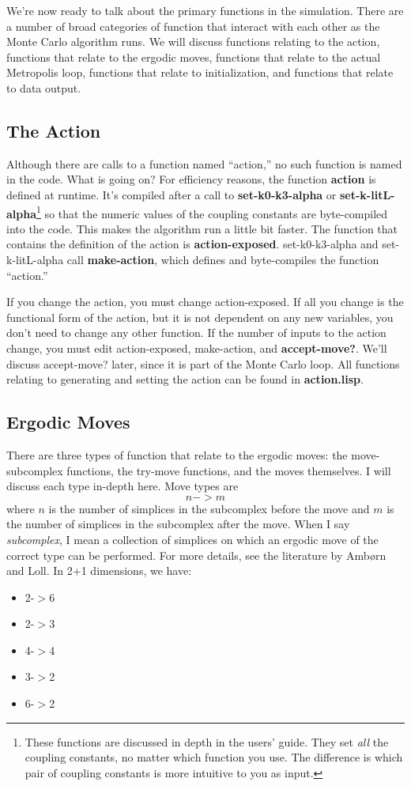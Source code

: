 \message{ !name(programmers_guide.tex)}\documentclass[12pt]{article}
\begin{document}
We're now ready to talk about the primary functions in the
simulation. There are a number of broad categories of function that
interact with each other as the Monte Carlo algorithm runs. We will
discuss functions relating to the action, functions that relate to the
ergodic moves, functions that relate to the actual Metropolis loop,
functions that relate to initialization, and functions that relate to
data output.

\subsection{The Action}

Although there are calls to a function named ``action,'' no such
function is named in the code. What is going on? For efficiency
reasons, the function \textbf{action} is defined at runtime. It's
compiled after a call to \textbf{set-k0-k3-alpha} or
\textbf{set-k-litL-alpha}\footnote{These functions are discussed in
  depth in the users' guide. They set \textit{all} the coupling
  constants, no matter which function you use. The difference is which
  pair of coupling constants is more intuitive to you as input.} so
that the numeric values of the coupling constants are byte-compiled
into the code. This makes the algorithm run a little bit faster. The
function that contains the definition of the action is
\textbf{action-exposed}. set-k0-k3-alpha and set-k-litL-alpha call
\textbf{make-action}, which defines and byte-compiles the function
``action.''

If you change the action, you must change action-exposed. If all you
change is the functional form of the action, but it is not dependent
on any new variables, you don't need to change any other function. If
the number of inputs to the action change, you must edit
action-exposed, make-action, and \textbf{accept-move?}. We'll discuss
accept-move? later, since it is part of the Monte Carlo loop. All
functions relating to generating and setting the action can be found
in \textbf{action.lisp}.

\subsection{Ergodic Moves}
There are three types of function that relate to the ergodic moves:
the move-subcomplex functions, the try-move functions, and the moves
themselves. I will discuss each type in-depth here. Move types are 
$$n->m$$
where $n$ is the number of simplices in the subcomplex before the move
and $m$ is the number of simplices in the subcomplex after the
move. When I say \textit{subcomplex}, I mean a collection of simplices
on which an ergodic move of the correct type can be performed. For
more details, see the literature by Amb\o rn and Loll. In 2+1
dimensions, we have:
\begin{itemize}
\item 2-$>$6
\item 2-$>$3
\item 4-$>$4
\item 3-$>$2
\item 6-$>$2
\end{itemize}
\end{document}
